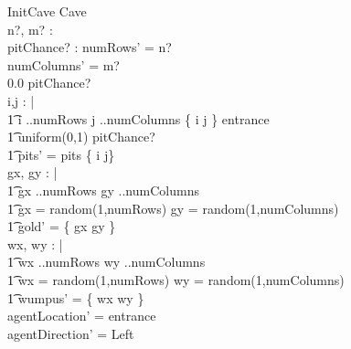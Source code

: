 \documentclass[a4paper]{article}
\begin{document}
\begin{schema}{InitCave}
	\Delta Cave \\
	n?, m? : \natone \\
	pitChance? : \real
\where
	numRows' = n? \\
	numColumns' = m? \\
	0.0 \leqslant pitChance?  \\
	\forall i,j : \natone | \\
	\t1	i ..numRows \land j ..numColumns 
		  \land \{ i \map j \} \neq entrance \dot \\
	\t1 uniform(0,1) \leqslant pitChance? \\
	\t1 \implies pits' = pits \union \{ i \map j\} \\
	\forall gx, gy : \natone | \\
	\t1 gx ..numRows \land gy ..numColumns \dot \\
	\t1 gx = random(1,numRows) \land gy = random(1,numColumns) \\
	\t1 \implies gold' = \{ gx \map gy \} \\
	\forall wx, wy : \natone | \\
	\t1 wx ..numRows \land wy ..numColumns \dot \\
	\t1 wx = random(1,numRows) \land wy = random(1,numColumns) \\
	\t1 \implies wumpus' = \{ wx \map wy \} \\
	agentLocation' = entrance \\
	agentDirection' = Left
\end{schema}
\end{document}
